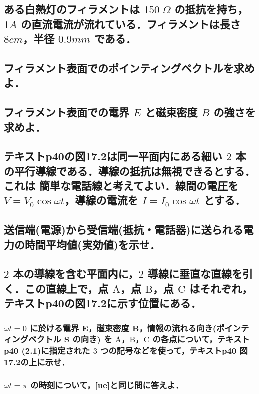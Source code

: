\documentclass[a4paper, 11pt]{bxjsarticle}
\begin{document}
\newpage

\begin{samepage}
\section{ある白熱灯のフィラメントは \(150\;\si{\Omega}\) の抵抗を持ち，\(1\si{A}\) の直流電流が流れている．フィラメントは長さ \(8\si{cm}\)，半径 \(0.9\si{mm}\) である．}
\subsection{フィラメント表面でのポインティングベクトルを求めよ．}
\vspace*{25em}
\subsection{フィラメント表面での電界 \(E\) と磁束密度 \(B\) の強さを求めよ．}
\end{samepage}

\newpage

\begin{samepage}
\section{テキストp40の図17.2は同一平面内にある細い \(2\) 本の平行導線である．導線の抵抗は無視できるとする．これは%
簡単な電話線と考えてよい．線間の電圧を \(V=V_0 \cos \omega t\)，導線の電流を \(I = I_0 \cos \omega t\) とする．}
\subsection{送信端(電源)から受信端(抵抗・電話器)に送られる電力の時間平均値(実効値)を示せ．}
\vspace*{13em}
\subsection{\(2\) 本の導線を含む平面内に，\(2\) 導線に垂直な直線を引く．この直線上で，点 \(\mathrm{A}\)，点 \(\mathrm{B}\)，点 \(\mathrm{C}\) はそれぞれ，テキストp40の図17.2に示す位置にある．}
\subsubsection{\(\omega t = 0\) に於ける電界 \(\boldsymbol{E}\)，磁束密度 \(\boldsymbol{B}\)，情報の流れる向き(ポインティングベクトル \(\boldsymbol S\) の向き) を \(\mathrm{A}\)，\(\mathrm{B}\)，\(\mathrm{C}\) の各点について，テキストp40 (2.1)に指定された \(3\) つの記号などを使って，テキストp40 図17.2の上に示せ．\label{ue}}
\vspace*{13em}
\subsubsection{\(\omega t = \pi\) の時刻について，\ref{ue}と同じ問に答えよ．}
\end{samepage}
\end{document}
